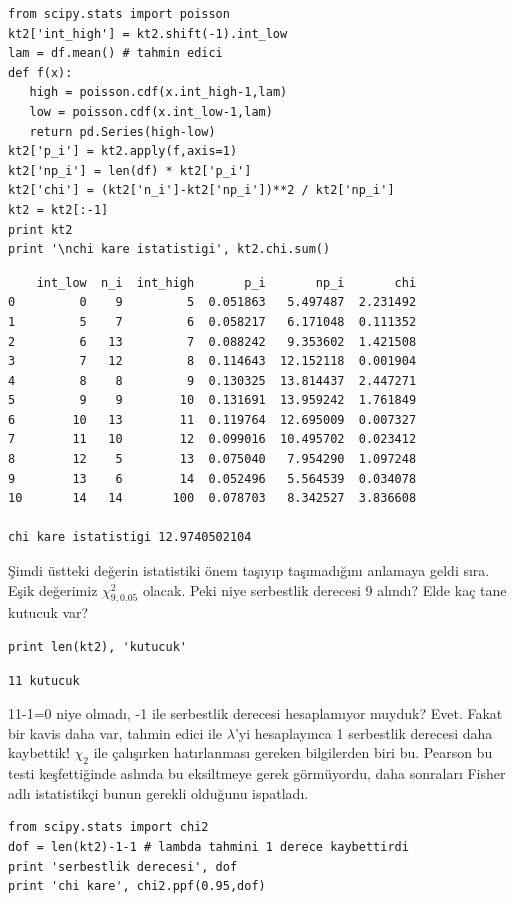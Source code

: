 \documentclass[12pt,fleqn]{article}\usepackage{../../common}
\begin{document}
\begin{verbatim}
from scipy.stats import poisson
kt2['int_high'] = kt2.shift(-1).int_low
lam = df.mean() # tahmin edici
def f(x): 
   high = poisson.cdf(x.int_high-1,lam)
   low = poisson.cdf(x.int_low-1,lam)
   return pd.Series(high-low)
kt2['p_i'] = kt2.apply(f,axis=1)
kt2['np_i'] = len(df) * kt2['p_i']
kt2['chi'] = (kt2['n_i']-kt2['np_i'])**2 / kt2['np_i']
kt2 = kt2[:-1]
print kt2
print '\nchi kare istatistigi', kt2.chi.sum()
\end{verbatim}

\begin{verbatim}
    int_low  n_i  int_high       p_i       np_i       chi
0         0    9         5  0.051863   5.497487  2.231492
1         5    7         6  0.058217   6.171048  0.111352
2         6   13         7  0.088242   9.353602  1.421508
3         7   12         8  0.114643  12.152118  0.001904
4         8    8         9  0.130325  13.814437  2.447271
5         9    9        10  0.131691  13.959242  1.761849
6        10   13        11  0.119764  12.695009  0.007327
7        11   10        12  0.099016  10.495702  0.023412
8        12    5        13  0.075040   7.954290  1.097248
9        13    6        14  0.052496   5.564539  0.034078
10       14   14       100  0.078703   8.342527  3.836608

chi kare istatistigi 12.9740502104
\end{verbatim}

Şimdi üstteki değerin istatistiki önem taşıyıp taşımadığını anlamaya geldi
sıra. Eşik değerimiz $\chi^2_{9,0.05}$ olacak. Peki niye serbestlik
derecesi 9 alındı? Elde kaç tane kutucuk var? 

\begin{verbatim}
print len(kt2), 'kutucuk'
\end{verbatim}

\begin{verbatim}
11 kutucuk
\end{verbatim}

11-1=0 niye olmadı, -1 ile serbestlik derecesi hesaplamıyor muyduk?
Evet. Fakat bir kavis daha var, tahmin edici ile $\lambda$'yi hesaplayınca
1 serbestlik derecesi daha kaybettik! $\chi_2$ ile çalışırken hatırlanması
gereken bilgilerden biri bu. Pearson bu testi keşfettiğinde aslında bu
eksiltmeye gerek görmüyordu, daha sonraları Fisher adlı istatistikçi bunun
gerekli olduğunu ispatladı.

\begin{verbatim}
from scipy.stats import chi2
dof = len(kt2)-1-1 # lambda tahmini 1 derece kaybettirdi
print 'serbestlik derecesi', dof
print 'chi kare', chi2.ppf(0.95,dof)
\end{verbatim}
\end{document}
